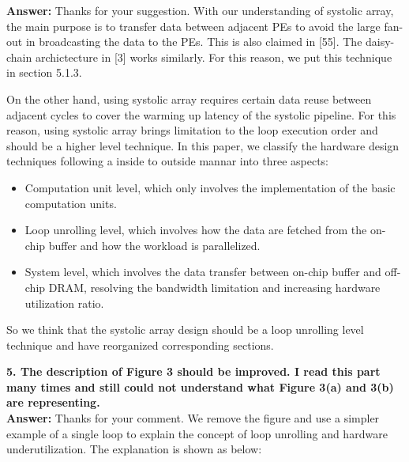 \documentclass[12pt]{paper}
\newcommand{\rev}[1]{{{\color[rgb]{0,0,1}{#1}}}}
\newcommand{\answer}[1]{\noindent\textbf{Answer:} #1}
\newcommand{\comment}[1]{\noindent\textbf{#1}\\}
\begin{document}
\answer{Thanks for your suggestion. With our understanding of systolic array, the main purpose is to transfer data between adjacent PEs to avoid the large fan-out in broadcasting the data to the PEs. This is also claimed in [55]. The daisy-chain archictecture in [3] works similarly. For this reason, we put this technique in section 5.1.3. 

On the other hand, using systolic array requires certain data reuse between adjacent cycles to cover the warming up latency of the systolic pipeline. For this reason, using systolic array brings limitation to the loop execution order and should be a higher level technique. In this paper, we classify the hardware design techniques following a inside to outside mannar into three aspects:
\begin{itemize}
    \item Computation unit level, which only involves the implementation of the basic computation units.
    \item Loop unrolling level, which involves how the data are fetched from the on-chip buffer and how the workload is parallelized.
    \item System level, which involves the data transfer between on-chip buffer and off-chip DRAM, resolving the bandwidth limitation and increasing hardware utilization ratio.
\end{itemize}

So we think that the systolic array design should be a loop unrolling level technique and have reorganized corresponding sections.
}

\comment{5.	The description of Figure 3 should be improved. I read this part many times and still could not understand what Figure 3(a) and 3(b) are representing.}

\answer{Thanks for your comment. We remove the figure and use a simpler example of a single loop to explain the concept of loop unrolling and hardware underutilization. The explanation is shown as below:\\

\rev{To parallelize the execution of the loops, we unroll the loops and parallelize the process of a certain number of iterations on hardware. The number of the parallelized iteraions on hardware is called the unroll parameter. Inappropriate unroll parameter selection may lead to serious hardware underutilization. Take a single loop as an example. Suppose the trip count of the loop is $M$ and the parallelism is $m$. The utilization ratio of the hardware is limited by $m/M\lceil M/m\rceil$. If $M$ is not divisible by $m$, then the utilization ratio is less than 1. Furthermore, in the case of NN process, the total utilization ratio will be the product of the utilization ratio along each of the loops.}}\\
\end{document}
